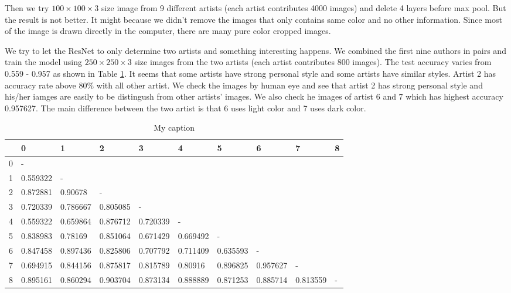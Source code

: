 \documentclass{article}
\begin{document}
Then we try $100 \times 100 \times 3$ size image from 9 different artists (each artist contributes 4000 images) and delete 4 layers before max pool. But the result is not better. It might because we didn't remove the images that only contains same color and no other information. Since most of the image is drawn directly in the computer, there are many pure color cropped images.

We try to let the ResNet to only determine two artists and something interesting happens. We combined the first nine authors in pairs and train the model using $250 \times 250 \times 3$ size images from the two artists (each artist contributes 800 images). The test accuracy varies from 0.559 - 0.957 as shown in Table \ref{my-label}. It seems that some artists have strong personal style and some artists have similar styles. Artist 2 has accuracy rate above 80\% with all other artist. We check the images by human eye and see that artist 2 has strong personal style and his/her iamges are easily to be distingush from other artists' images. We also check he images of artist 6 and 7 which has highest accuracy 0.957627. The main difference between the two artist is that 6 uses light color and 7 uses dark color.



\begin{table}[]\footnotesize
\centering
\caption{My caption}
\label{my-label}
\begin{tabular}{@{}llllllllll@{}}
\toprule
  & 0        & 1        & 2        & 3        & 4        & 5        & 6        & 7        & 8 \\ \midrule
0 & -        &          &          &          &          &          &          &          &   \\
1 & 0.559322 & -        &          &          &          &          &          &          &   \\
2 & 0.872881 & 0.90678  & -        &          &          &          &          &          &   \\
3 & 0.720339 & 0.786667 & 0.805085 & -        &          &          &          &          &   \\
4 & 0.559322 & 0.659864 & 0.876712 & 0.720339 & -        &          &          &          &   \\
5 & 0.838983 & 0.78169  & 0.851064 & 0.671429 & 0.669492 & -        &          &          &   \\
6 & 0.847458 & 0.897436 & 0.825806 & 0.707792 & 0.711409 & 0.635593 & -        &          &   \\
7 & 0.694915 & 0.844156 & 0.875817 & 0.815789 & 0.80916  & 0.896825 & 0.957627 & -        &   \\
8 & 0.895161 & 0.860294 & 0.903704 & 0.873134 & 0.888889 & 0.871253 & 0.885714 & 0.813559 & - \\ \bottomrule
\end{tabular}
\end{table}
\end{document}
